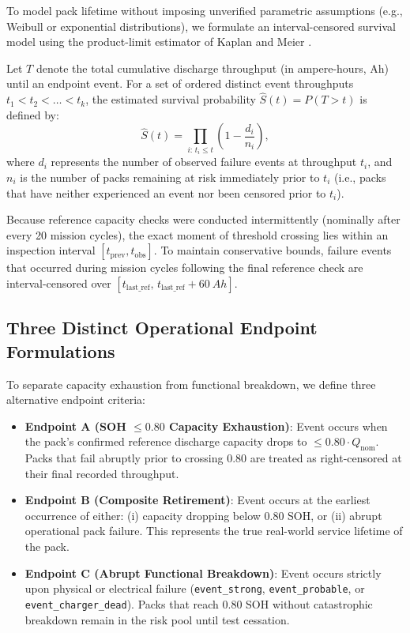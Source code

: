 To model pack lifetime without imposing unverified parametric assumptions
(e.g., Weibull or exponential distributions), we formulate an
interval-censored survival model using the product-limit estimator of
Kaplan and Meier \cite{kaplan1958nonparametric}.

Let $T$ denote the total cumulative discharge throughput (in ampere-hours,
$\mathrm{Ah}$) until an endpoint event. For a set of ordered distinct event
throughputs $t_1 < t_2 < \dots < t_k$, the estimated survival probability
$\hat{S}(t) = P(T > t)$ is defined by:
\begin{equation}
  \hat{S}(t) = \prod_{i:\, t_i \le t} \left( 1 - \frac{d_i}{n_i} \right),
  \label{eq:kaplan_meier}
\end{equation}
where $d_i$ represents the number of observed failure events at throughput
$t_i$, and $n_i$ is the number of packs remaining at risk immediately prior
to $t_i$ (i.e., packs that have neither experienced an event nor been censored
prior to $t_i$).

Because reference capacity checks were conducted intermittently (nominally
after every 20 mission cycles), the exact moment of threshold crossing
lies within an inspection interval $[t_{\mathrm{prev}}, t_{\mathrm{obs}}]$.
To maintain conservative bounds, failure events that occurred during mission
cycles following the final reference check are interval-censored over
$[t_{\mathrm{last\_ref}},\, t_{\mathrm{last\_ref}} + \SI{60}{Ah}]$.

\subsection{Three Distinct Operational Endpoint Formulations}

To separate capacity exhaustion from functional breakdown, we define
three alternative endpoint criteria:
\begin{itemize}
  \item \textbf{Endpoint A (SOH $\le 0.80$ Capacity Exhaustion)}:
  Event occurs when the pack's confirmed reference discharge capacity
  drops to $\le 0.80 \cdot Q_{\mathrm{nom}}$. Packs that fail abruptly
  prior to crossing 0.80 are treated as right-censored at their final
  recorded throughput.
  \item \textbf{Endpoint B (Composite Retirement)}:
  Event occurs at the earliest occurrence of either: (i) capacity dropping
  below 0.80 SOH, or (ii) abrupt operational pack failure. This represents
  the true real-world service lifetime of the pack.
  \item \textbf{Endpoint C (Abrupt Functional Breakdown)}:
  Event occurs strictly upon physical or electrical failure
  (\texttt{event\_strong}, \texttt{event\_probable}, or
  \allowbreak\texttt{event\_charger\_dead}). Packs that reach 0.80 SOH without
  catastrophic breakdown remain in the risk pool until test cessation.
\end{itemize}

